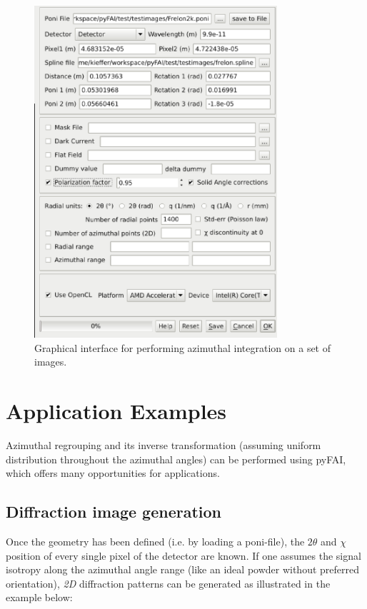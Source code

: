 \documentclass{iucr}
\begin{document}
\begin{figure}
\label{pyFAI-integrate}
\begin{center}
\includegraphics[width=9cm]{integrate.eps}
\caption{Graphical interface for performing azimuthal integration on a set of
images.}
\end{center}
\end{figure}

\section{Application Examples}

Azimuthal regrouping and its inverse transformation (assuming
uniform distribution throughout the azimuthal angles) can be performed
using pyFAI, which offers many opportunities for applications.

\subsection{Diffraction image generation}

Once the geometry has been defined (i.e. by loading a poni-file), the $2\theta$
and $\chi$ position of every single pixel of the detector are known.
If one assumes the signal isotropy along the azimuthal angle range (like an
ideal powder without preferred orientation), \textit{2D} diffraction patterns can be
generated as illustrated in the example below:
\end{document}
